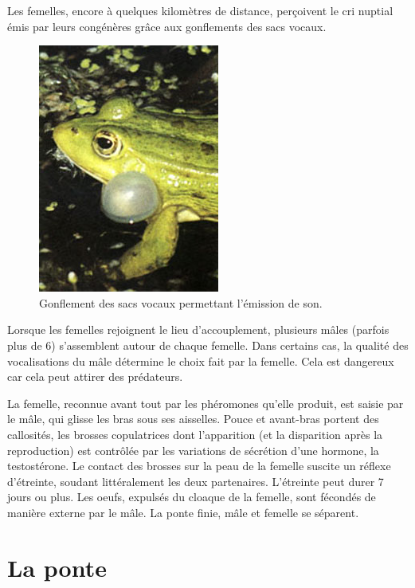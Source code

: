 Les femelles, encore à quelques kilomètres de distance, perçoivent le cri nuptial émis par leurs congénères grâce aux gonflements des sacs vocaux.


\begin{figure}
	\begin{center}

	\includegraphics[width=.5\textwidth]{laRepro/sacvocal.jpg}	
	\end{center}
	\caption{Gonflement des sacs vocaux permettant l'émission de son.}%
	\label{fig:grossejoue}
\end{figure}


        Lorsque les femelles rejoignent le lieu d’accouplement, plusieurs mâles (parfois plus de 6) s’assemblent autour de chaque femelle. Dans certains cas, la qualité des vocalisations du mâle détermine le choix fait par la femelle. Cela est dangereux car cela peut attirer des prédateurs.

        La femelle, reconnue avant tout par les phéromones qu’elle produit, est saisie par le mâle, qui glisse les bras sous ses aisselles. Pouce et avant-bras portent des callosités, les brosses copulatrices dont l’apparition (et la disparition après la reproduction) est contrôlée par les variations de sécrétion d’une hormone, la testostérone. Le contact des brosses sur la peau de la femelle suscite un réflexe d’étreinte, soudant littéralement les deux partenaires. L’étreinte peut durer 7 jours ou plus. Les oeufs, expulsés du cloaque de la femelle, sont fécondés de manière externe par le mâle. La ponte finie, mâle et femelle se séparent.

 
\section{La ponte}

